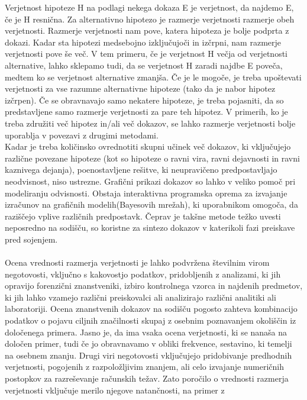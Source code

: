 \documentclass[mat1, tisk]{fmfdelo}
\theoremstyle{definition} %
\theoremstyle{trditev} %
\theoremstyle{izrek}
\begin{document}
Verjetnost hipoteze H na podlagi nekega dokaza E je verjetnost, da najdemo E, če je H resnična. Za alternativno hipotezo je razmerje verjetnosti razmerje obeh
verjetnosti. Razmerje verjetnosti nam pove, katera hipoteza je bolje podprta z dokazi. Kadar sta hipotezi medsebojno izključujoči in izčrpni, nam razmerje verjetnosti pove še več.
V tem primeru, če je verjetnost H večja od verjetnosti alternative, lahko sklepamo tudi, da se verjetnost H zaradi najdbe E poveča, medtem ko se
verjetnost alternative zmanjša. Če je le mogoče, je treba upoštevati verjetnosti za vse razumne alternativne hipoteze (tako da je nabor hipotez
izčrpen). Če se obravnavajo samo nekatere hipoteze, je treba pojasniti, da so predstavljene samo razmerje verjetnosti za pare teh hipotez. V primerih, ko je treba
združiti več hipotez in/ali več dokazov, se lahko razmerje verjetnosti bolje uporablja v povezavi z drugimi metodami.\\
Kadar je treba količinsko ovrednotiti skupni učinek več dokazov, ki vključujejo različne povezane hipoteze (kot so hipoteze o ravni vira, ravni
dejavnosti in ravni kaznivega dejanja), poenostavljene rešitve, ki neupravičeno predpostavljajo neodvisnost, niso ustrezne. Grafični prikazi dokazov
so lahko v veliko pomoč pri modeliranju odvisnosti. Obstaja interaktivna programska oprema za izvajanje izračunov na grafičnih modelih(Bayesovih mrežah),
ki uporabnikom omogoča, da raziščejo vplive različnih predpostavk. Čeprav je takšne metode težko uvesti neposredno na sodišču, so koristne za sintezo
dokazov v katerikoli fazi preiskave pred sojenjem.\\\\
Ocena vrednosti razmerja verjetnosti je lahko podvržena številnim virom negotovosti, vključno s kakovostjo podatkov, pridobljenih z analizami, ki jih
opravijo forenzični znanstveniki, izbiro kontrolnega vzorca in najdenih predmetov, ki jih lahko vzamejo različni preiskovalci ali analizirajo različni
analitiki ali laboratoriji. Ocena znanstvenih dokazov na sodišču pogosto zahteva kombinacijo podatkov o pojavu ciljnih značilnosti skupaj z osebnim poznavanjem
okoliščin iz določenega primera. Jasno je, da ima vsaka ocena verjetnosti, ki se nanaša na določen primer, tudi če jo obravnavamo v obliki frekvence, sestavino,
ki temelji na osebnem znanju. Drugi viri negotovosti vključujejo pridobivanje predhodnih verjetnosti, pogojenih z razpoložljivim znanjem, ali celo
izvajanje numeričnih postopkov za razreševanje računskih težav. Zato poročilo o vrednosti razmerja verjetnosti vključuje merilo njegove natančnosti, na primer z
\end{document}
